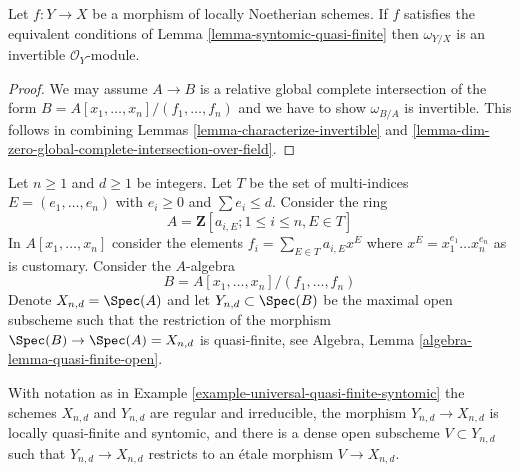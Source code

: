 \begin{lemma}
\label{lemma-dualizing-syntomic-quasi-finite}
Let $f : Y \to X$ be a morphism of locally Noetherian schemes. If $f$
satisfies the equivalent conditions of Lemma \ref{lemma-syntomic-quasi-finite}
then $\omega_{Y/X}$ is an invertible $\mathcal{O}_Y$-module.
\end{lemma}

\begin{proof}
We may assume $A \to B$ is a relative global complete
intersection of the form $B = A[x_1, \ldots, x_n]/(f_1, \ldots, f_n)$
and we have to show $\omega_{B/A}$ is invertible.
This follows in combining Lemmas \ref{lemma-characterize-invertible} and
\ref{lemma-dim-zero-global-complete-intersection-over-field}.
\end{proof}

\begin{example}
\label{example-universal-quasi-finite-syntomic}
Let $n \geq 1$ and $d \geq 1$ be integers. Let $T$ be the set of
multi-indices $E = (e_1, \ldots, e_n)$ with $e_i \geq 0$ and
$\sum e_i \leq d$. Consider the ring
$$
A = \mathbf{Z}[a_{i, E} ; 1 \leq i \leq n, E \in T]
$$
In $A[x_1, \ldots, x_n]$ consider the elements
$f_i = \sum_{E \in T} a_{i, E} x^E$ where $x^E = x_1^{e_1} \ldots x_n^{e_n}$
as is customary. Consider the $A$-algebra
$$
B = A[x_1, \ldots, x_n]/(f_1, \ldots, f_n)
$$
Denote $X_{n, d} = \Spec(A)$ and let $Y_{n, d} \subset \Spec(B)$
be the maximal open subscheme such that the restriction of the
morphism $\Spec(B) \to \Spec(A) = X_{n, d}$ is quasi-finite, see
Algebra, Lemma \ref{algebra-lemma-quasi-finite-open}.
\end{example}

\begin{lemma}
\label{lemma-universal-quasi-finite-syntomic-etale}
With notation as in Example \ref{example-universal-quasi-finite-syntomic}
the schemes $X_{n, d}$ and $Y_{n, d}$ are regular and irreducible,
the morphism $Y_{n, d} \to X_{n, d}$ is locally quasi-finite and
syntomic, and there is a dense open subscheme $V \subset Y_{n, d}$
such that $Y_{n, d} \to X_{n, d}$ restricts to an \'etale morphism
$V \to X_{n, d}$.
\end{lemma}

